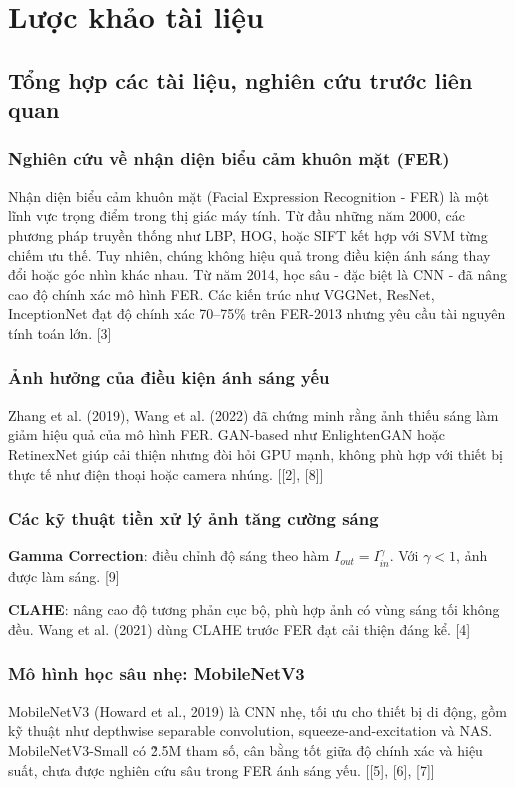 \section{Lược khảo tài liệu} %
\subsection{Tổng hợp các tài liệu, nghiên cứu trước liên quan}

\subsubsection{Nghiên cứu về nhận diện biểu cảm khuôn mặt (FER)}
Nhận diện biểu cảm khuôn mặt (Facial Expression Recognition - FER) là một lĩnh vực trọng điểm trong thị giác máy tính. Từ đầu những năm 2000, các phương pháp truyền thống như LBP, HOG, hoặc SIFT kết hợp với SVM từng chiếm ưu thế. Tuy nhiên, chúng không hiệu quả trong điều kiện ánh sáng thay đổi hoặc góc nhìn khác nhau. Từ năm 2014, học sâu - đặc biệt là CNN - đã nâng cao độ chính xác mô hình FER. Các kiến trúc như VGGNet, ResNet, InceptionNet đạt độ chính xác 70--75\% trên FER-2013 nhưng yêu cầu tài nguyên tính toán lớn. [3]

\subsubsection{Ảnh hưởng của điều kiện ánh sáng yếu}
Zhang et al. (2019), Wang et al. (2022) đã chứng minh rằng ảnh thiếu sáng làm giảm hiệu quả của mô hình FER. GAN-based như EnlightenGAN hoặc RetinexNet giúp cải thiện nhưng đòi hỏi GPU mạnh, không phù hợp với thiết bị thực tế như điện thoại hoặc camera nhúng. [[2], [8]]

\subsubsection{Các kỹ thuật tiền xử lý ảnh tăng cường sáng}
\textbf{Gamma Correction}: điều chỉnh độ sáng theo hàm \(I_{out} = I_{in}^\gamma\). Với \(\gamma < 1\), ảnh được làm sáng. [9]\par
\textbf{CLAHE}: nâng cao độ tương phản cục bộ, phù hợp ảnh có vùng sáng tối không đều. Wang et al. (2021) dùng CLAHE trước FER đạt cải thiện đáng kể. [4]

\subsubsection{Mô hình học sâu nhẹ: MobileNetV3}
MobileNetV3 (Howard et al., 2019) là CNN nhẹ, tối ưu cho thiết bị di động, gồm kỹ thuật như depthwise separable convolution, squeeze-and-excitation và NAS. MobileNetV3-Small có \~2.5M tham số, cân bằng tốt giữa độ chính xác và hiệu suất, chưa được nghiên cứu sâu trong FER ánh sáng yếu. [[5], [6], [7]]

